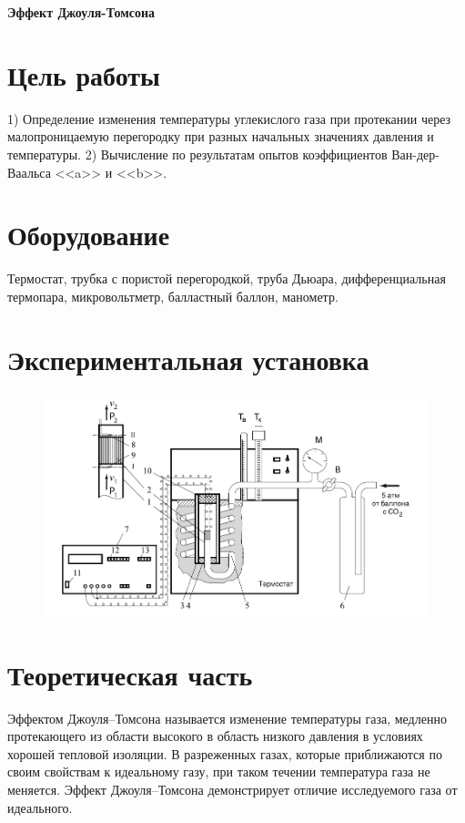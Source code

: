 \documentclass[a4paper, fontsize=14pt]{article}
\begin{document}
\parindent=1cm


\huge
\centering
\textbf{Эффект Джоуля-Томсона}

\raggedright
\large
	\section*{Цель работы}
		1) Определение изменения температуры углекислого газа при протекании через малопроницаемую перегородку при разных начальных значениях давления и температуры.
		2) Вычисление по результатам опытов коэффициентов Ван-дер-Ваальса <<a>> и <<b>>.
	\section*{Оборудование}
	Термостат, трубка с пористой перегородкой, труба Дьюара, дифференциальная термопара, микровольтметр, балластный баллон, манометр.
	\section*{Экспериментальная установка}
		\begin{figure}[H]
	\includegraphics[width = \linewidth]{instrument}
	\end{figure}

	
	\section*{Теоретическая часть}
		Эффектом Джоуля–Томсона называется изменение температуры газа, медленно протекающего из области высокого в область низкого давления в условиях хорошей тепловой изоляции. В разреженных газах, которые приближаются по своим свойствам к идеальному газу, при таком течении температура газа не меняется. Эффект Джоуля–Томсона демонстрирует отличие исследуемого газа от идеального.
\end{document}
